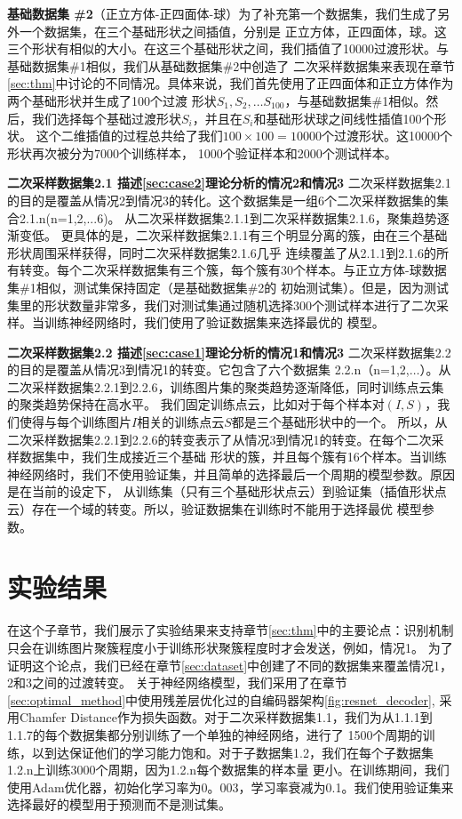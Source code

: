 \documentclass[bachelor, nocolorlinks, printoneside]{seuthesis} %
\begin{document}
\begin{Main}
\textbf{基础数据集 \#2}（正立方体-正四面体-球）为了补充第一个数据集，我们生成了另外一个数据集，在三个基础形状之间插值，分别是
正立方体，正四面体，球。这三个形状有相似的大小。在这三个基础形状之间，我们插值了10000过渡形状。与基础数据集\#1相似，我们从基础数据集\#2中创造了
二次采样数据集来表现在章节\ref{sec:thm}中讨论的不同情况。具体来说，我们首先使用了正四面体和正立方体作为两个基础形状并生成了100个过渡
形状$S_1,S_2,\ldots S_100$，与基础数据集\#1相似。然后，我们选择每个基础过渡形状$S_i$，并且在$S_i$和基础形状球之间线性插值100个形状。
这个二维插值的过程总共给了我们$100 \times 100 = 10000$个过渡形状。这10000个形状再次被分为7000个训练样本，
1000个验证样本和2000个测试样本。 

\textbf{二次采样数据集2.1 描述\ref{sec:case2}理论分析的情况2和情况3} 二次采样数据集2.1的目的是覆盖从情况2到情况3的转化。这个数据集是一组6个二次采样数据集的集合2.1.n(n=1,2,...6)。
从二次采样数据集2.1.1到二次采样数据集2.1.6，聚集趋势逐渐变低。
更具体的是，二次采样数据集2.1.1有三个明显分离的簇，由在三个基础形状周围采样获得，同时二次采样数据集2.1.6几乎
连续覆盖了从2.1.1到2.1.6的所有转变。每个二次采样数据集有三个簇，每个簇有30个样本。与正立方体-球数据集$\#$1相似，测试集保持固定（是基础数据集$\#$2的
初始测试集）。但是，因为测试集里的形状数量非常多，我们对测试集通过随机选择300个测试样本进行了二次采样。当训练神经网络时，我们使用了验证数据集来选择最优的
模型。

\textbf{二次采样数据集2.2 描述\ref{sec:case1}理论分析的情况1和情况3} 二次采样数据集2.2的目的是覆盖从情况3到情况1的转变。它包含了六个数据集
2.2.n（n=1,2,$\ldots$）。从二次采样数据集2.2.1到2.2.6，训练图片集的聚类趋势逐渐降低，同时训练点云集的聚类趋势保持在高水平。
我们固定训练点云，比如对于每个样本对$(I,S)$，我们使得与每个训练图片$I$相关的训练点云$S$都是三个基础形状中的一个。
所以，从二次采样数据集2.2.1到2.2.6的转变表示了从情况3到情况1的转变。在每个二次采样数据集中，我们生成接近三个基础
形状的簇，并且每个簇有16个样本。当训练神经网络时，我们不使用验证集，并且简单的选择最后一个周期的模型参数。原因是在当前的设定下，
从训练集（只有三个基础形状点云）到验证集（插值形状点云）存在一个域的转变。所以，验证数据集在训练时不能用于选择最优
模型参数。


\section{实验结果}
在这个子章节，我们展示了实验结果来支持章节\ref{sec:thm}中的主要论点：识别机制只会在训练图片聚簇程度小于训练形状聚簇程度时才会发送，例如，情况1。
为了证明这个论点，我们已经在章节\ref{sec:dataset}中创建了不同的数据集来覆盖情况1，2和3之间的过渡转变。
关于神经网络模型，我们采用了在章节\ref{sec:optimal_method}中使用残差层优化过的自编码器架构\ref{fig:resnet_decoder},
采用Chamfer Distance作为损失函数。对于二次采样数据集1.1，我们为从1.1.1到1.1.7的每个数据集都分别训练了一个单独的神经网络，进行了
1500个周期的训练，以到达保证他们的学习能力饱和。对于子数据集1.2，我们在每个子数据集1.2.n上训练3000个周期，因为1.2.n每个数据集的样本量
更小。在训练期间，我们使用Adam优化器，初始化学习率为0。003，学习率衰减为0.1。我们使用验证集来选择最好的模型用于预测而不是测试集。


\end{Main}
\end{document}
